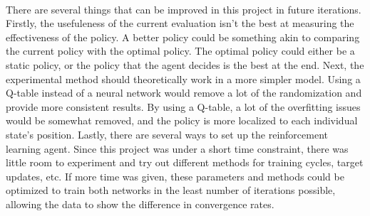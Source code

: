 \documentclass[12pt]{article}
\begin{document}
\paragraph{}
There are several things that can be improved in this project in future iterations.
Firstly, the usefuleness of the current evaluation isn't the best at measuring the effectiveness of the policy.
A better policy could be something akin to comparing the current policy with the optimal policy.
The optimal policy could either be a static policy, or the policy that the agent decides is the best at the end.
Next, the experimental method should theoretically work in a more simpler model.
Using a Q-table instead of a neural network would remove a lot of the randomization and provide more consistent results.
By using a Q-table, a lot of the overfitting issues would be somewhat removed, and the policy is more localized to each individual state's position.
Lastly, there are several ways to set up the reinforcement learning agent.
Since this project was under a short time constraint, there was little room to experiment and try out different methods for training cycles, target updates, etc.
If more time was given, these parameters and methods could be optimized to train both networks in the least number of iterations possible, allowing the data to show the difference in convergence rates.

















\newpage


\end{document}
